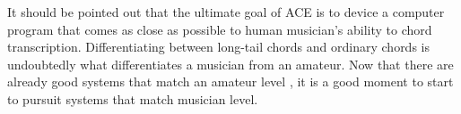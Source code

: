 It should be pointed out that the ultimate goal of ACE is to device a computer program that comes as close as possible to human musician's ability to chord transcription. Differentiating between long-tail chords and ordinary chords is undoubtedly what differentiates a musician from an amateur. Now that there are already good systems that match an amateur level \cite{ni2013understanding}, it is a good moment to start to pursuit systems that match musician level.

\begin{comment}
Inevitably, due to difference in musical training, human annotators sometimes disagree, especially on long-tail chords \cite{humphreyfour}. In a very strict sense, there is not any ``gold standard'' if human might disagree with each other. But in a loose sense, theoretically there could be a ``gold standard'' if:
\begin{itemize}
\item all annotations are done by only one annotator, or
\item all annotations are done by multiple annotators (much more than two).
\end{itemize}
In the former case, that only annotator ``dictates'' a local ``gold standard'', so that whenever a machine tries to learn from the data, it actually targets at this annotator's ``style''. In the latter case, multiple annotators decide a ``gold standard'' in a way such as majority vote or data fusion \cite{koopsintegration,klein2004sensor}, so that a trained model actually aims at the optimal ``style'' that minimizes the objections within these annotators. Therefore, although the ``gold standard'' is indeed an important issue, designing a system that ``learns well'' remains another big part of the same problem.
\end{comment}



